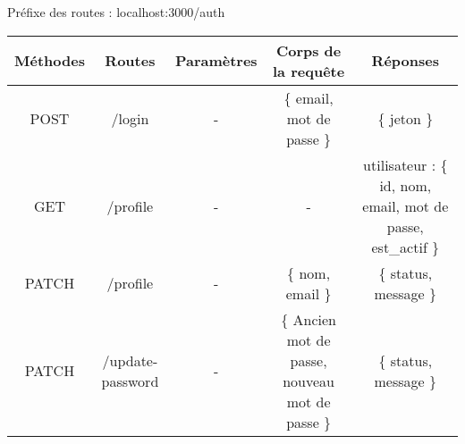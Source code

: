 Préfixe des routes :
    localhost:3000/auth
\begin{center}
    \begin{tabular}[ht]{|c|c|c|c|c|}
        \hline
            Méthodes & Routes & Paramètres & Corps de la requête & Réponses \\
        \hline
            POST  & /login & - & \{ email, mot de passe \}  & \{ jeton \} \\
        \hline
            GET  & /profile & - & - &  utilisateur : \{ id, nom, email, mot de passe, est\_actif \}  \\
        \hline
            PATCH  & /profile & - & \{ nom, email \} & \{ status, message \} \\
        \hline
            PATCH  & /update-password & - & \{ Ancien mot de passe, nouveau mot de passe \} & \{ status, message \} \\
        \hline
    \end{tabular}
\end{center}
\pagebreak

